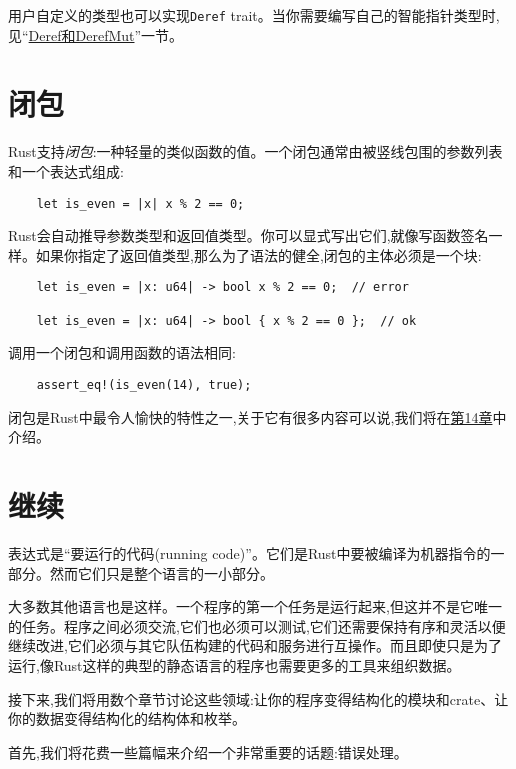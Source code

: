 用户自定义的类型也可以实现\texttt{Deref} trait。当你需要编写自己的智能指针类型时,见“\hyperref[deref]{Deref和DerefMut}”一节。

\section{闭包}
Rust支持\emph{闭包}:一种轻量的类似函数的值。一个闭包通常由被竖线包围的参数列表和一个表达式组成:
\begin{verbatim}
    let is_even = |x| x % 2 == 0;
\end{verbatim}

Rust会自动推导参数类型和返回值类型。你可以显式写出它们,就像写函数签名一样。如果你指定了返回值类型,那么为了语法的健全,闭包的主体必须是一个块:
\begin{verbatim}
    let is_even = |x: u64| -> bool x % 2 == 0;  // error
    
    let is_even = |x: u64| -> bool { x % 2 == 0 };  // ok
\end{verbatim}

调用一个闭包和调用函数的语法相同:
\begin{verbatim}
    assert_eq!(is_even(14), true);
\end{verbatim}

闭包是Rust中最令人愉快的特性之一,关于它有很多内容可以说,我们将在\hyperref[ch14]{第14章}中介绍。

\section{继续}

表达式是“要运行的代码(running code)”。它们是Rust中要被编译为机器指令的一部分。然而它们只是整个语言的一小部分。

大多数其他语言也是这样。一个程序的第一个任务是运行起来,但这并不是它唯一的任务。程序之间必须交流,它们也必须可以测试,它们还需要保持有序和灵活以便继续改进,它们必须与其它队伍构建的代码和服务进行互操作。而且即使只是为了运行,像Rust这样的典型的静态语言的程序也需要更多的工具来组织数据。

接下来,我们将用数个章节讨论这些领域:让你的程序变得结构化的模块和crate、让你的数据变得结构化的结构体和枚举。

首先,我们将花费一些篇幅来介绍一个非常重要的话题:错误处理。
